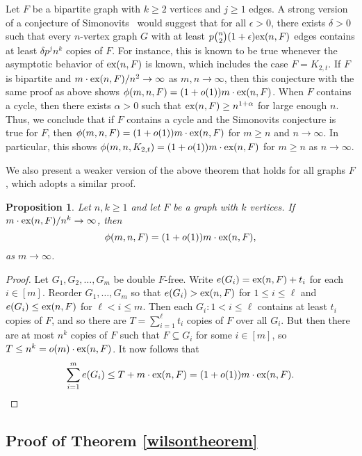 \documentclass[12pt]{article}
\newtheorem{proposition}[theorem]{Proposition}
\newcommand*{\ex}{\textnormal{ex}}
\begin{document}
Let $F$ be a bipartite graph with $k \geq 2$ vertices and $j \geq 1$ edges. A strong version of a conjecture of Simonovits~\cite{Sidorenko1993,Simonovits1984} would suggest that for all $\epsilon > 0$, there exists $\delta > 0$ such that every $n$-vertex graph $G$ with at least $p\binom{n}{2}(1 + \epsilon)\ex(n,F)$ edges contains at least $\delta p^j n^{k}$ copies of $F$. For instance, this is known to be true whenever the asymptotic behavior of $\ex(n,F)$ is known, which includes the case $F = K_{2,t}$. If $F$ is bipartite and $m \cdot \ex(n,F)/n^2 \rightarrow \infty$ as $m,n \rightarrow \infty$, then this conjecture with the same proof as above shows $\phi(m,n,F) = (1 + o(1))m \cdot \ex(n,F)$. When $F$ contains a cycle, then there exists $\alpha > 0$ such that $\ex(n,F) \geq n^{1 + \alpha}$ for large enough $n$. Thus, we conclude that if $F$ contains a cycle and the Simonovits conjecture is true for $F$, then $\phi(m,n,F) = (1 + o(1))m \cdot \ex(n,F)$ for $m \geq n$ and $n \rightarrow \infty$. In particular, this shows $\phi(m,n,K_{2,t}) = (1 + o(1))m \cdot \ex(n,F)$ for $m \geq n$ as $n \rightarrow \infty$.

We also present a weaker version of the above theorem that holds for all graphs $F$, which adopts a similar proof.

\begin{proposition}\label{thm:asymp-weak}
  Let $n, k \geq 1$ and let $F$ be a graph with $k$ vertices. If $m \cdot \ex(n, F)/n^k \to \infty$, then
  \[
    \phi(m, n, F) = (1 + o(1))m \cdot \ex(n, F),
  \]
  as $m \to \infty$.
\end{proposition}

\begin{proof}
  Let $G_1, G_2, \ldots, G_m$ be double $F$-free. Write $e(G_i) = \ex(n, F) + t_i$ for each $i \in [m]$. Reorder $G_1, \ldots, G_m$ so that $e(G_i) > \ex(n, F)$ for $1 \leq i \leq \ell$ and $e(G_i) \leq \ex(n, F)$ for $\ell < i \leq m$. Then each $G_i : 1 < i \leq \ell$ contains at least $t_i$ copies of $F$, and so there are $T = \sum_{i = 1}^\ell t_i$ copies of $F$ over all $G_i$. But then there are at most $n^k$ copies of $F$ such that $F \subseteq G_i$ for some $i \in [m]$, so $T \leq n^k = o(m) \cdot \ex(n, F)$. It now follows that
  \[
    \sum_{i = 1}^m e(G_i) \leq T + m \cdot \ex(n, F) = (1 + o(1))m \cdot \ex(n, F).
  \]
\end{proof}

\subsection{Proof of Theorem \ref{wilsontheorem}} 
\end{document}
